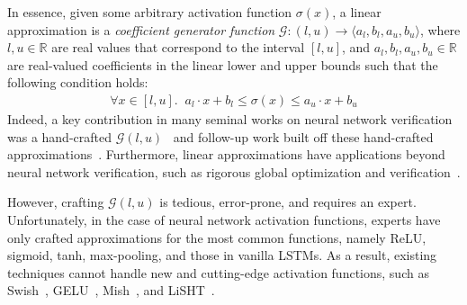 In essence, given some arbitrary activation function $ \sigma(x) $, a linear
approximation is a \textit{coefficient generator function}
$ \mathcal{G}: (l, u) \to \langle a_l, b_l, a_u, b_u \rangle $, where $ l, u
\in \mathbb{R} $ are real values that correspond to the interval $ [l, u] $,
and $ a_l, b_l, a_u, b_u \in \mathbb{R} $ are real-valued coefficients
in the linear lower and upper bounds such that the following condition holds:
\begin{equation}
\begin{gathered}
\forall x \in [l, u]. \;\; a_l \cdot x + b_l \leq \sigma(x) \leq a_u
\cdot x + b_u
\end{gathered}
\end{equation}
Indeed, a key contribution in many seminal works on neural network verification
was a hand-crafted $ \mathcal{G}(l, u)
$~\cite{SinghGPV19,WangPWYJ18,WangPWYJ18nips,balunovic2019certifying,du2021cert,ko2019popqorn,zhang2018efficient,WengZCSHDBD18,wu2021tightening,ryou2021scalable,shi2020robustness}
and follow-up work built off these
hand-crafted
approximations~\cite{KatzHIJLLSTWZDK19,tjeng2019evaluating,SinghGPV19iclr,Singh2019krelu}.
Furthermore, linear approximations have applications beyond neural network
verification, such as rigorous global optimization and
verification~\cite{lebbah2007efficient,trombettoni2011inner}.

However, crafting $ \mathcal{G}(l, u) $ is tedious, error-prone, and requires
an expert. Unfortunately, in the case of neural network activation functions,
experts have only crafted approximations for the most common functions, namely
ReLU, sigmoid, tanh, max-pooling, and those in vanilla LSTMs. As a result,
existing techniques cannot handle new and cutting-edge activation functions,
such as Swish~\cite{ramachandran2017searching},
GELU~\cite{hendrycks2016gaussian}, Mish~\cite{misra2019mish}, and
LiSHT~\cite{roy2019lisht}.

